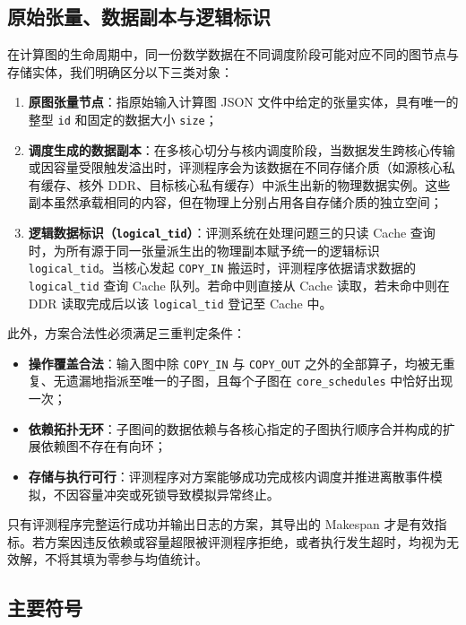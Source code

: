 \documentclass[anonymous,notoc]{gmcm2026}
\providecommand{\tightlist}{\setlength{\itemsep}{0pt}\setlength{\parskip}{0pt}}
\begin{document}
\subsection{原始张量、数据副本与逻辑标识}

在计算图的生命周期中，同一份数学数据在不同调度阶段可能对应不同的图节点与存储实体，我们明确区分以下三类对象：

\begin{enumerate}
\def\labelenumi{\arabic{enumi}.}
\tightlist
\item
  \textbf{原图张量节点}：指原始输入计算图 JSON 文件中给定的张量实体，具有唯一的整型 \texttt{id} 和固定的数据大小 \texttt{size}；
\item
  \textbf{调度生成的数据副本}：在多核心切分与核内调度阶段，当数据发生跨核心传输或因容量受限触发溢出时，评测程序会为该数据在不同存储介质（如源核心私有缓存、核外 DDR、目标核心私有缓存）中派生出新的物理数据实例。这些副本虽然承载相同的内容，但在物理上分别占用各自存储介质的独立空间；
\item
  \textbf{逻辑数据标识（\texttt{logical\_tid}）}：评测系统在处理问题三的只读 Cache 查询时，为所有源于同一张量派生出的物理副本赋予统一的逻辑标识 \texttt{logical\_tid}。当核心发起 \texttt{COPY\_IN} 搬运时，评测程序依据请求数据的 \texttt{logical\_tid} 查询 Cache 队列。若命中则直接从 Cache 读取，若未命中则在 DDR 读取完成后以该 \texttt{logical\_tid} 登记至 Cache 中。
\end{enumerate}

此外，方案合法性必须满足三重判定条件：

\begin{itemize}
\tightlist
\item
  \textbf{操作覆盖合法}：输入图中除 \texttt{COPY\_IN} 与 \texttt{COPY\_OUT} 之外的全部算子，均被无重复、无遗漏地指派至唯一的子图，且每个子图在 \texttt{core\_schedules} 中恰好出现一次；
\item
  \textbf{依赖拓扑无环}：子图间的数据依赖与各核心指定的子图执行顺序合并构成的扩展依赖图不存在有向环；
\item
  \textbf{存储与执行可行}：评测程序对方案能够成功完成核内调度并推进离散事件模拟，不因容量冲突或死锁导致模拟异常终止。
\end{itemize}

只有评测程序完整运行成功并输出日志的方案，其导出的 Makespan 才是有效指标。若方案因违反依赖或容量超限被评测程序拒绝，或者执行发生超时，均视为无效解，不将其填为零参与均值统计。

\subsection{主要符号}
\end{document}
